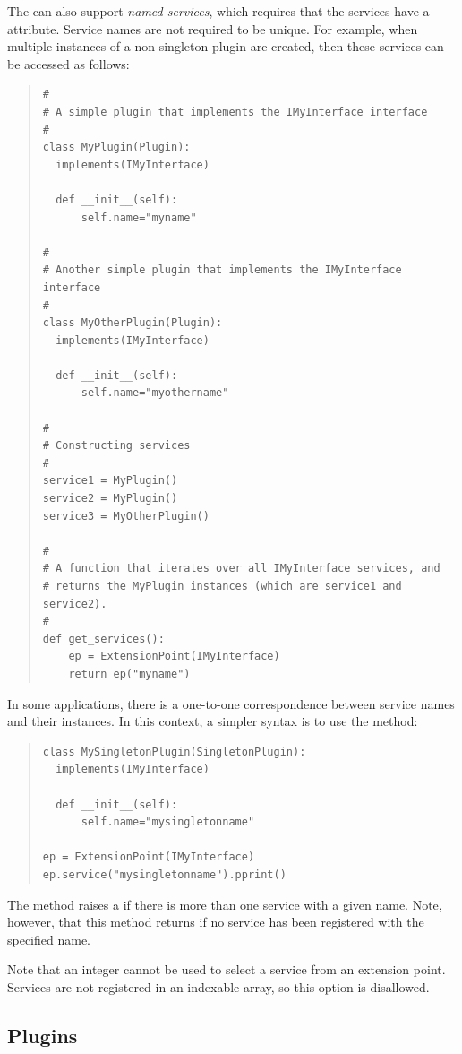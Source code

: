 The \pcasp can also support \textit{named services}, which requires that
the services have a  attribute. Service names are not required
to be unique. For example, when multiple instances of a non-singleton
plugin are created, then these services can be accessed as follows:
\newpage
\begin{quotation}
\begin{lstlisting}
#
# A simple plugin that implements the IMyInterface interface
#
class MyPlugin(Plugin):
  implements(IMyInterface)

  def __init__(self):
      self.name="myname"

#
# Another simple plugin that implements the IMyInterface interface
#
class MyOtherPlugin(Plugin):
  implements(IMyInterface)

  def __init__(self):
      self.name="myothername"

#
# Constructing services
#
service1 = MyPlugin()
service2 = MyPlugin()
service3 = MyOtherPlugin()

#
# A function that iterates over all IMyInterface services, and
# returns the MyPlugin instances (which are service1 and service2).
#
def get_services():
    ep = ExtensionPoint(IMyInterface)
    return ep("myname")
\end{lstlisting}
\end{quotation}
In some applications, there is a one-to-one correspondence between service
names and their instances. In this context, a simpler syntax is to use
the  method:
\begin{quotation}
\begin{lstlisting}
class MySingletonPlugin(SingletonPlugin):
  implements(IMyInterface)

  def __init__(self):
      self.name="mysingletonname"

ep = ExtensionPoint(IMyInterface)
ep.service("mysingletonname").pprint()
\end{lstlisting}
\end{quotation}
The  method raises a  if there is more than one service
with a given name. Note, however, that this method returns  if no
service has been registered with the specified name.

Note that an integer cannot be used to select a service from an extension
point. Services are not registered in an indexable array, so this option
is disallowed.


\subsection{Plugins}


